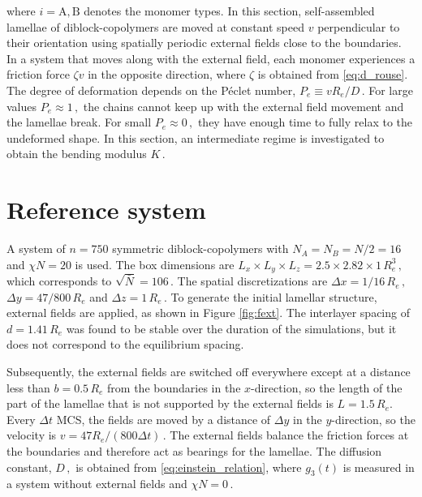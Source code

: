\documentclass[bachelor,       %
               twoside,        %
               BCOR10mm,       %
               ngerman, english %
               ]{GAUBM}
\begin{document}
where $i=\mathrm A,\mathrm B$ denotes the monomer types. In this section, self-assembled lamellae of diblock-copolymers are moved at constant speed $v$ perpendicular to their orientation using spatially periodic external fields close to the boundaries. In a system that moves along with the external field, each monomer experiences a friction force $\zeta v$ in the opposite direction, where $\zeta$ is obtained from \eqref{eq:d_rouse}. The degree of deformation depends on the P\'eclet number, $P_e\equiv vR_e/D\,.$ For large values $P_e\approx 1\,,$ the chains cannot keep up with the external field movement and the lamellae break. For small $P_e\approx0\,,$ they have enough time to fully relax to the undeformed shape. In this section, an intermediate regime is investigated to obtain the bending modulus $K\,.$ 

\section{Reference system}
A system of $n=750$ symmetric diblock-copolymers with $N_A=N_B=N/2=16$ and $\chi N=20$ is used. The box dimensions are $L_x\times L_y\times L_z=2.5\times2.82\times1\,R_e^3\,,$ which corresponds to $\sqrt{\bar{N}}=106\,.$ The spatial discretizations are $\Delta x=1/16\,R_e\,,$ $\Delta y=47/800\,R_e$ and $\Delta z=1\,R_e\,.$ To generate the initial lamellar structure, external fields are applied, as shown in Figure \ref{fig:fext}. The interlayer spacing of $d=1.41\,R_e$ was found to be stable over the duration of the simulations, but it does not correspond to the equilibrium spacing.

Subsequently, the external fields are switched off everywhere except at a distance less than $b=0.5\,R_e$ from the boundaries in the $x$-direction, so the length of the part of the lamellae that is not supported by the external fields is $L=1.5\,R_e$. Every $\Delta t$ MCS, the fields are moved by a distance of $\Delta y$ in the $y$-direction, so the velocity is $v=47R_e/(800\Delta t)\,.$ The external fields balance the friction forces at the boundaries and therefore act as bearings for the lamellae. The diffusion constant, $D\,,$ is obtained from \eqref{eq:einstein_relation}, where $g_3(t)$ is measured in a system without external fields and $\chi N=0\,.$
\end{document}
